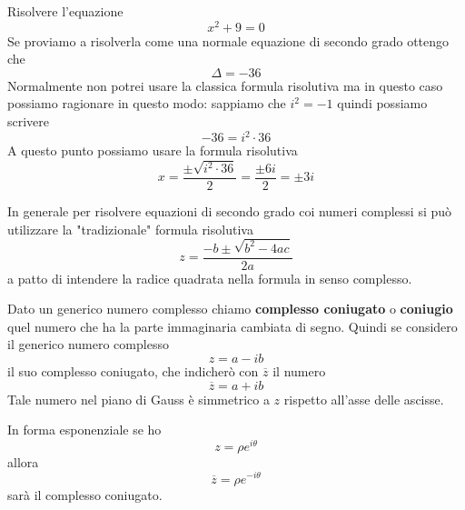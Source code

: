 \begin{example}
	Risolvere l'equazione
	\begin{equation*}
		x^2 + 9 = 0
	\end{equation*}
	Se proviamo a risolverla come una normale equazione di secondo grado ottengo che
	\begin{equation*}
		\Delta = -36
	\end{equation*}
	Normalmente non potrei usare la classica formula risolutiva ma in questo caso possiamo
	ragionare in questo modo: sappiamo che $i^2 = -1$ quindi possiamo scrivere
	\begin{equation*}
		-36 = i^2 \cdot 36
	\end{equation*}
	A questo punto possiamo usare la formula risolutiva
	\begin{equation*}
		x = \frac{\pm \sqrt{i^2 \cdot 36}}{2} = \frac{\pm 6i}{2} = \pm 3i
	\end{equation*}
\end{example}

In generale per risolvere equazioni di secondo grado coi numeri complessi si pu\`o utilizzare
la "tradizionale" formula risolutiva
\begin{equation*}
	z = \frac{-b \pm \sqrt{b^2 - 4ac}}{2a}
\end{equation*}
a patto di intendere la radice quadrata nella formula in senso complesso.

\begin{definition}
	Dato un generico numero complesso chiamo \textbf{complesso coniugato} o \textbf{coniugio}
	quel numero che ha la parte immaginaria cambiata di segno. Quindi se considero il generico
	numero complesso
	\begin{equation*}
		z = a - ib
	\end{equation*}
	il suo complesso coniugato, che indicher\`o con $\overline{z}$ il numero
	\begin{equation*}
		\overline{z} = a + ib
	\end{equation*}
	Tale numero nel piano di Gauss \`e simmetrico a $z$ rispetto all'asse delle ascisse.
\end{definition}

\begin{observation}
	In forma esponenziale se ho
	\begin{equation*}
		z = \rho e^{i \theta}
	\end{equation*}
	allora
	\begin{equation*}
		\overline{z} = \rho e^{-i \theta}
	\end{equation*}
	sar\`a il complesso coniugato.
\end{observation}

